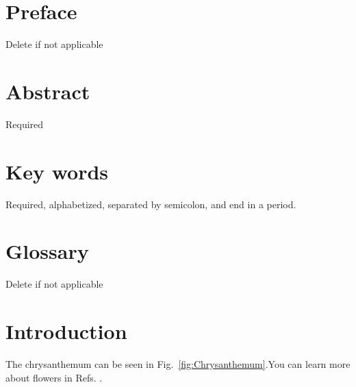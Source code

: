 \documentclass[12pt]{article}
\begin{document}
\section*{Preface}
\normalsize Delete if not applicable\\
\section*{Abstract}
\normalsize Required\\
\section*{Key words}
\normalsize Required, alphabetized, separated by semicolon, and end in a period.\\
\pagebreak
\begin{center}
	\tableofcontents
	\listoftables
	\listoffigures
\end{center}
\pagebreak
\section*{Glossary}
Delete if not applicable\\
\pagebreak
\section{Introduction}
\label{sec:intro}
\normalsize The chrysanthemum can be seen in Fig.~\ref{fig:Chrysanthemum}.You can learn more about flowers in Refs. \cite{wilkinson_1990,Xiong2015,Prives2016,Roberts1982,Maloney2016,giancoli2008physics,Eston1993,MSU-CSE-06-2,Farindon,Marcheford,Joslin,Caxton,Isley,FIPS1402,SP80053r4}. 
\end{document}
